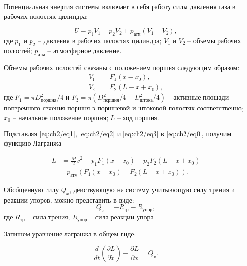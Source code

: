 Потенциальная энергия системы включает в себя работу силы давления газа в рабочих полостях цилиндра:

\begin{equation}\label{eq:ch2/eq2}
    U = p_1 V_1 + p_2 V_2 + p_\text{атм} (V_1 - V_2),
\end{equation}
где $p_1$ и $p_2$ -- давления в рабочих полостях цилиндра;
$V_1$ и $V_2$ -- объемы рабочих полостей;
$p_\text{атм}$ -- атмосферное давление.

Объемы рабочих полостей связаны с положением поршня следующим образом:
\begin{equation}\label{eq:ch2/eq3}
    \begin{aligned}
        V_1 & = F_1 (x - x_0),     \\
        V_2 & = F_2 (L - x + x_0),
    \end{aligned}
\end{equation}
где $F_1=\pi D_{поршня}^2/4 $ и $F_2 = \pi (D_{поршня}^2/4 - D_{штока}^2/4)$ -- активные площади поперечного сечения поршня в поршневой и штоковой полостях соответственно;
$x_0$ -- начальное положение поршня;
$L$ -- ход поршня.

Подставляя \eqref{eq:ch2/eq1}, \eqref{eq:ch2/eq2} и \eqref{eq:ch2/eq3} в \eqref{eq:ch2/eq0}, получим функцию Лагранжа:

\begin{equation}\label{eq:ch2/eq4}
    \begin{aligned}
        L & = \frac{M}{2} \dot{x}^2 - p_1 F_1 (x - x_0) - p_2 F_2 (L - x + x_0) \\
          & - p_\text{атм} (F_1 (x - x_0) - F_2 (L - x + x_0)).
    \end{aligned}
\end{equation}

Обобщенную силу $Q_x$, действующую на систему учитывющую силу трения и реакции упоров, можно представить в виде:
\begin{equation}\label{eq:ch2/eq5}
    Q_x = - R_{\text{тр}} - R_{\text{упор}},
\end{equation}
где $R_{\text{тр}}$ -- сила трения; $R_{\text{упор}}$ -- сила реакции упора.

Запишем уравнение лагранжа в общем виде:

\begin{equation}\label{eq:ch2/eq6}
    \frac{d}{dt} \left( \frac{\partial L}{\partial \dot{x}} \right) - \frac{\partial L}{\partial x} = Q_x.
\end{equation}

